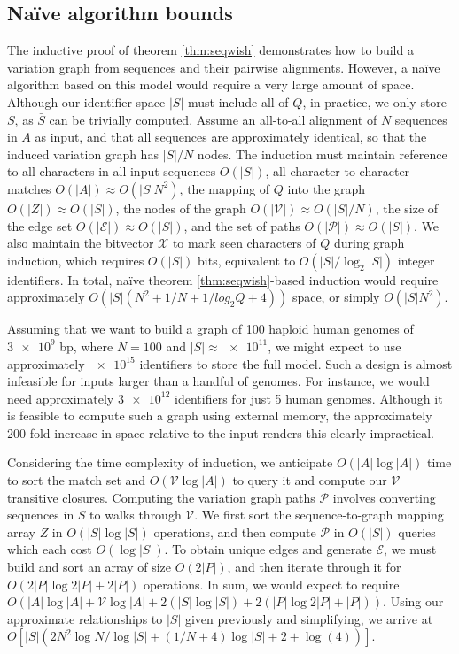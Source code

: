 \documentclass{bioinfo}
\theoremstyle{definition}
\begin{document}

\subsection{Na\"{i}ve algorithm bounds}
\label{sec:bounds}

The inductive proof of theorem \ref{thm:seqwish} demonstrates how to build a variation graph from sequences and their pairwise alignments.
However, a na\"{i}ve algorithm based on this model would require a very large amount of space.
Although our identifier space $|S|$ must include all of $Q$, in practice, we only store $S$, as $\bar{S}$ can be trivially computed.
Assume an all-to-all alignment of $N$ sequences in $A$ as input, and that all sequences are approximately identical, so that the induced variation graph has $|S|/N$ nodes.
The induction must maintain reference to all characters in all input sequences $O(|S|)$, all character-to-character matches $O(|A|) \approx O(|S| N^2)$, the mapping of $Q$ into the graph $O(|Z|) \approx O(|S|)$, the nodes of the graph $O(|\mathcal{V}|) \approx O(|S|/N)$, the size of the edge set $O(|\mathcal{E}|) \approx O(|S|)$, and the set of paths $O(|\mathcal{P}|) \approx O(|S|)$.
We also maintain the bitvector $\mathcal{X}$ to mark seen characters of $Q$ during graph induction, which requires $O(|S|)$ bits, equivalent to $O(|S| / \log_2 |S|)$ integer identifiers.
In total, na\"{i}ve theorem \ref{thm:seqwish}-based induction would require approximately $O(|S|(N^2 + 1/N + 1/log_2{Q} + 4))$ space, or simply $O(|S| N^2)$.

Assuming that we want to build a graph of 100 haploid human genomes of $\num{3e9}$ bp, where $N=100$ and $|S| \approx \num{e11}$, we might expect to use approximately $\num{e15}$ identifiers to store the full model.
Such a design is almost infeasible for inputs larger than a handful of genomes.
For instance, we would need approximately $\num{3e12}$ identifiers for just 5 human genomes.
Although it is feasible to compute such a graph using external memory, the approximately 200-fold increase in space relative to the input renders this clearly impractical.

Considering the time complexity of induction, we anticipate $O(|A|\log|A|)$ time to sort the match set and $O(\mathcal{V} \log |A|)$ to query it and compute our $\mathcal{V}$ transitive closures.
Computing the variation graph paths $\mathcal{P}$ involves converting sequences in $S$ to walks through $\mathcal{V}$.
We first sort the sequence-to-graph mapping array $Z$ in $O(|S| \log |S|)$ operations, and then compute $\mathcal{P}$ in $O(|S|)$ queries which each cost $O(\log |S|)$.
To obtain unique edges and generate $\mathcal{E}$, we must build and sort an array of size $O(2|P|)$, and then iterate through it for $O(2|P| \log 2|P| + 2|P|)$ operations.
In sum, we would expect to require $O(|A|\log|A| + \mathcal{V} \log |A| + 2(|S| \log |S|) + 2(|P| \log 2|P| + |P|))$.
Using our approximate relationships to $|S|$ given previously and simplifying, we arrive at $O[|S|(2N^2 \log N / \log |S| + (1/N + 4)\log |S| + 2 + \log(4))]$.
\end{document}
